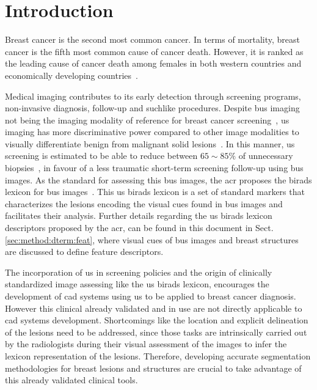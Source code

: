 \graphicspath{ {./content/intro/figures/} }

\section{Introduction}
\label{sec:intro}  %


Breast cancer is the second most common cancer.
In terms of mortality, breast cancer is the fifth most common cause of cancer death.
However, it is ranked as the leading cause of cancer death among females in both western countries and economically developing countries~\cite{cancerStatistics2011}.

Medical imaging contributes to its early detection through screening programs, non-invasive diagnosis, follow-up and suchlike procedures.
Despite \ac{bus} imaging not being the imaging modality of reference for breast cancer screening~\cite{smith2003american}, \ac{us} imaging has more discriminative power compared to other image modalities to visually differentiate benign from malignant solid lesions~\cite{Stavros:1995p12392}.
In this manner, \ac{us} screening is estimated to be able to reduce 
between $65\sim85\%$ of unnecessary biopsies~\cite{yuan2010multimodality}, in favour of a less traumatic short-term screening follow-up using \ac{bus} images.
As the standard for assessing this \ac{bus} images, the \ac{acr} proposes the \ac{birads} lexicon for \ac{bus} images~\cite{biradsus}.
This \ac{us} \ac{birads} lexicon is a set of standard markers that characterizes the lesions encoding the visual cues found in \ac{bus} images and facilitates their analysis.
Further details regarding the \ac{us} \ac{birads} lexicon descriptors proposed by the \ac{acr}, can be found in this document in Sect.\,\ref{sec:method:dterm:feat}, where visual cues of \ac{bus} images and breast structures are discussed to define feature descriptors.

The incorporation of \ac{us} in screening policies and the origin of clinically standardized image assessing like the \ac{us} \ac{birads} lexicon, encourages the development of \ac{cad} systems using \ac{us} to be applied to breast cancer diagnosis.
However this clinical already validated and in use are not directly applicable to \ac{cad} systems development. 
Shortcomings like the location and explicit delineation of the lesions need to be addressed, since those tasks are intrinsically carried out by the radiologists during their visual assessment of the images to infer the lexicon representation of the lesions.
Therefore, developing accurate segmentation methodologies for breast lesions and structures are crucial to take advantage of this already validated clinical tools.

